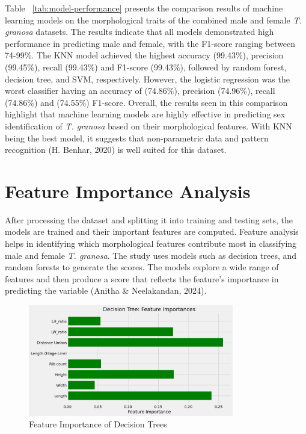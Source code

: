 Table ~\ref{tab:model-performance} presents the comparison results of machine learning models on the morphological traits of the combined  male and female \textit{T. granosa} datasets. The results indicate that all models demonstrated high performance in predicting male and female, with the F1-score ranging between 74-99\%. The KNN model achieved the highest accuracy (99.43\%), precision (99.45\%), recall (99.43\%) and F1-score (99.43\%), followed by random forest, decision tree, and SVM, respectively. However, the logistic regression was the worst classifier having an accuracy of (74.86\%), precision (74.96\%), recall (74.86\%) and (74.55\%) F1-score. Overall, the results seen in this comparison highlight that machine learning models are highly effective in predicting sex identification of \textit{T. granosa} based on their morphological features. With KNN being the best model, it suggests that non-parametric data and pattern recognition (H. Benhar, 2020) is well suited for this dataset. 

\section{Feature Importance Analysis}
After processing the dataset and splitting it into training and testing sets, the models are trained and their important features are computed. Feature analysis helps in identifying which morphological features contribute most in classifying male and female \textit{T. granosa}. The study uses models such as decision trees, and random forests to generate the scores. The models explore a wide range of features and then produce a score that reflects the feature’s importance in predicting the variable (Anitha \& Neelakandan, 2024).  

\begin{figure}[!htbp]
	\centering
	\includegraphics[width=0.8\textwidth]{figures/decision-trees.png}
	\caption{Feature Importance of Decision Trees}
	\label{fig:decision-trees}
\end{figure}

